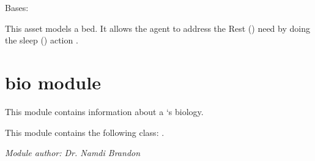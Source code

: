 \documentclass[letterpaper,10pt,english]{sphinxmanual}
\begin{document}
\begin{fulllineitems}
\label{bed:bed.Bed}
Bases: {\hyperref[asset:asset.Asset]{\emph{}}}

This asset models a bed. It allows the agent to address the Rest ({\hyperref[rest:rest.Rest]{\emph{}}}) need by doing the     sleep ({\hyperref[sleep:sleep.Sleep]{\emph{}}}) action .

\end{fulllineitems}



\section{bio module}
\label{bio::doc}\label{bio:module-bio}\label{bio:bio-module}
This module contains information about a {\hyperref[person:person.Person]{\emph{}}}`s biology.

This module contains the following class: {\hyperref[bio:bio.Bio]{\emph{}}}.

\emph{Module author: Dr. Namdi Brandon}
\end{document}
